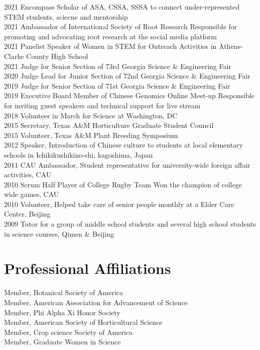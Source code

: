 \documentclass[11pt,a4paper,]{awesome-cv}
\begin{document}
2021 Encompass Scholar of ASA, CSSA, SSSA to connect under-represented
STEM students, sciecne and mentorship\\
2021 Ambassador of International Society of Root Research \textbar{}
Responsible for promoting and advocating root research at the social
media platform\\
2021 Panelist Speaker of Women in STEM for Outreach Activities in
Athens-Clarke County High School\\
2021 Judge for Senior Section of 73rd Georgia Science \& Engineering
Fair\\
2020 Judge Lead for Junior Section of 72nd Georgia Science \&
Engineering Fair\\
2019 Judge for Senior Section of 71st Georgia Science \& Engineering
Fair\\
2019 Executive Board Member of Chinese Genomics Online Meet-up
\textbar{} Responsible for inviting guest speakers and technical support
for live stream\\
2018 Volunteer in March for Science at Washington, DC\\
2015 Secretary, Texas A\&M Horticulture Graduate Student Council\\
2015 Volunteer, Texas A\&M Plant Breeding Symposium\\
2012 Speaker, Introduction of Chinese culture to students at local
elementary schools in Ichikikushikino-shi, kagoshima, Japan\\
2011 CAU Ambassador, Student representative for university-wide foreign
affair activities, CAU\\
2010 Scrum Half Player of College Rugby Team \textbar{} Won the champion
of college wide games, CAU\\
2010 Volunteer, Helped take care of senior people monthly at a Elder
Care Center, Beijing\\
2009 Tutor for a group of middle school students and several high school
students in science courses, Qimen \& Beijing

\hypertarget{professional-affiliations}{%
\section{Professional Affiliations}\label{professional-affiliations}}

Member, Botanical Society of America\\
Member, American Association for Advancement of Science\\
Member, Phi Alpha Xi Honor Society\\
Member, American Society of Horticultural Science\\
Member, Crop science Society of America\\
Member, Graduate Women in Science
\end{document}
